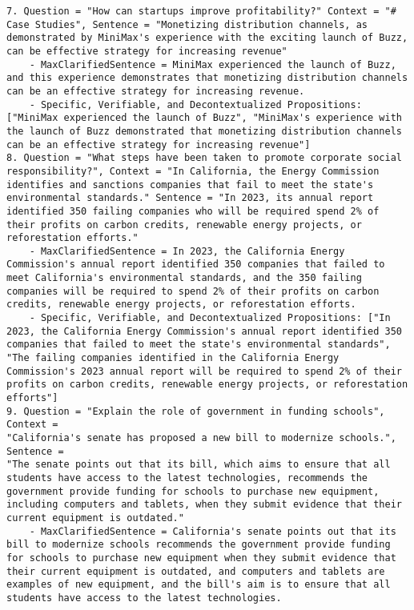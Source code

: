 \begin{tcolorbox}
\begin{lstlisting}[breaklines=true, breakindent=0pt, basicstyle=\small\ttfamily\raggedright, xleftmargin=-5pt, frame=none, xrightmargin=-5pt, aboveskip=-2pt, belowskip=-2pt]
7. Question = "How can startups improve profitability?" Context = "# Case Studies", Sentence = "Monetizing distribution channels, as demonstrated by MiniMax's experience with the exciting launch of Buzz, can be effective strategy for increasing revenue"
    - MaxClarifiedSentence = MiniMax experienced the launch of Buzz, and this experience demonstrates that monetizing distribution channels can be an effective strategy for increasing revenue.
    - Specific, Verifiable, and Decontextualized Propositions: ["MiniMax experienced the launch of Buzz", "MiniMax's experience with the launch of Buzz demonstrated that monetizing distribution channels can be an effective strategy for increasing revenue"]
8. Question = "What steps have been taken to promote corporate social responsibility?", Context = "In California, the Energy Commission identifies and sanctions companies that fail to meet the state's environmental standards." Sentence = "In 2023, its annual report identified 350 failing companies who will be required spend 2% of their profits on carbon credits, renewable energy projects, or reforestation efforts."
    - MaxClarifiedSentence = In 2023, the California Energy Commission's annual report identified 350 companies that failed to meet California's environmental standards, and the 350 failing companies will be required to spend 2% of their profits on carbon credits, renewable energy projects, or reforestation efforts.
    - Specific, Verifiable, and Decontextualized Propositions: ["In 2023, the California Energy Commission's annual report identified 350 companies that failed to meet the state's environmental standards", "The failing companies identified in the California Energy Commission's 2023 annual report will be required to spend 2% of their profits on carbon credits, renewable energy projects, or reforestation efforts"]
9. Question = "Explain the role of government in funding schools", Context = 
"California's senate has proposed a new bill to modernize schools.", Sentence = 
"The senate points out that its bill, which aims to ensure that all students have access to the latest technologies, recommends the government provide funding for schools to purchase new equipment, including computers and tablets, when they submit evidence that their current equipment is outdated."
    - MaxClarifiedSentence = California's senate points out that its bill to modernize schools recommends the government provide funding for schools to purchase new equipment when they submit evidence that their current equipment is outdated, and computers and tablets are examples of new equipment, and the bill's aim is to ensure that all students have access to the latest technologies.

\end{lstlisting}
\end{tcolorbox}
